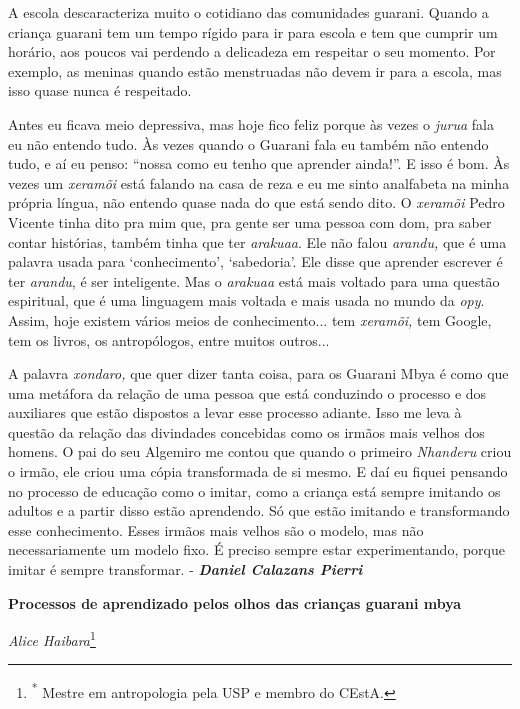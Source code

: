 A escola descaracteriza muito o cotidiano das comunidades guarani.
Quando a criança guarani tem um tempo rígido para ir para escola e tem
que cumprir um horário, aos poucos vai perdendo a delicadeza em
respeitar o seu momento. Por exemplo, as meninas quando estão
menstruadas não devem ir para a escola, mas isso quase nunca é
respeitado.

Antes eu ficava meio depressiva, mas hoje fico feliz porque às vezes o
\emph{jurua} fala eu não entendo tudo. Às vezes quando o Guarani fala eu
também não entendo tudo, e aí eu penso: ``nossa como eu tenho que
aprender ainda!''. E isso é bom. Às vezes um \emph{xeramõi} está falando
na casa de reza e eu me sinto analfabeta na minha própria língua, não
entendo quase nada do que está sendo dito. O \emph{xeramõi} Pedro
Vicente tinha dito pra mim que, pra gente ser uma pessoa com dom, pra
saber contar histórias, também tinha que ter \emph{arakuaa}. Ele não
falou \emph{arandu,} que é uma palavra usada para `conhecimento',
`sabedoria'. Ele disse que aprender escrever é ter \emph{arandu}, é ser
inteligente. Mas o \emph{arakuaa} está mais voltado para uma questão
espiritual, que é uma linguagem mais voltada e mais usada no mundo da
\emph{opy}. Assim, hoje existem vários meios de conhecimento... tem
\emph{xeramõi,} tem Google, tem os livros, os antropólogos, entre muitos
outros...

A palavra \emph{xondaro,} que quer dizer tanta coisa, para os Guarani
Mbya é como que uma metáfora da relação de uma pessoa que está
conduzindo o processo e dos auxiliares que estão dispostos a levar esse
processo adiante. Isso me leva à questão da relação das divindades
concebidas como os irmãos mais velhos dos homens. O pai do seu Algemiro
me contou que quando o primeiro \emph{Nhanderu} criou o irmão, ele criou
uma cópia transformada de si mesmo. E daí eu fiquei pensando no processo
de educação como o imitar, como a criança está sempre imitando os
adultos e a partir disso estão aprendendo. Só que estão imitando e
transformando esse conhecimento. Esses irmãos mais velhos são o modelo,
mas não necessariamente um modelo fixo. É preciso sempre estar
experimentando, porque imitar é sempre transformar. -
\emph{\textbf{Daniel Calazans Pierri }}

\textbf{Processos de aprendizado pelos olhos das crianças guarani mbya}

\emph{Alice Haibara}\footnote{\textsuperscript{*} Mestre em antropologia
  pela USP e membro do CEstA.}

